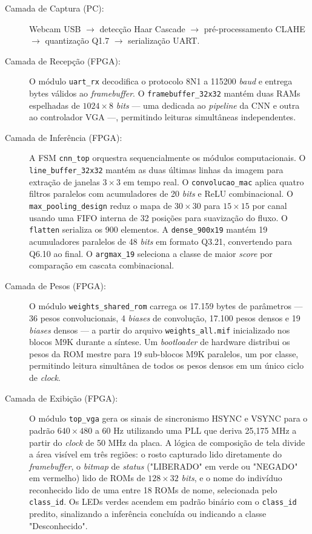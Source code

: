 \begin{description}
    \item[Camada de Captura (PC):] Webcam USB $\rightarrow$ detecção Haar Cascade $\rightarrow$ pré-processamento CLAHE $\rightarrow$ quantização Q1.7 $\rightarrow$ serialização UART.
    \item[Camada de Recepção (FPGA):] O módulo \texttt{uart\_rx} decodifica o protocolo 8N1 a 115200 \textit{baud} e entrega bytes válidos ao \textit{framebuffer}. O \texttt{framebuffer\_32x32} mantém duas RAMs espelhadas de $1024 \times 8$ \textit{bits} — uma dedicada ao \textit{pipeline} da CNN e outra ao controlador VGA —, permitindo leituras simultâneas independentes.
    \item[Camada de Inferência (FPGA):] A FSM \texttt{cnn\_top} orquestra sequencialmente os módulos computacionais. O \texttt{line\_buffer\_32x32} mantém as duas últimas linhas da imagem para extração de janelas $3 \times 3$ em tempo real. O \texttt{convolucao\_mac} aplica quatro filtros paralelos com acumuladores de 20 \textit{bits} e ReLU combinacional. O \texttt{max\_pooling\_design} reduz o mapa de $30 \times 30$ para $15 \times 15$ por canal usando uma FIFO interna de 32 posições para suavização do fluxo. O \texttt{flatten} serializa os 900 elementos. A \texttt{dense\_900x19} mantém 19 acumuladores paralelos de 48 \textit{bits} em formato Q3.21, convertendo para Q6.10 ao final. O \texttt{argmax\_19} seleciona a classe de maior \textit{score} por comparação em cascata combinacional.
    \item[Camada de Pesos (FPGA):] O módulo \texttt{weights\_shared\_rom} carrega os 17.159 bytes de parâmetros — 36 pesos convolucionais, 4 \textit{biases} de convolução, 17.100 pesos densos e 19 \textit{biases} densos — a partir do arquivo \texttt{weights\_all.mif} inicializado nos blocos M9K durante a síntese. Um \textit{bootloader} de hardware distribui os pesos da ROM mestre para 19 sub-blocos M9K paralelos, um por classe, permitindo leitura simultânea de todos os pesos densos em um único ciclo de \textit{clock}.
    \item[Camada de Exibição (FPGA):] O módulo \texttt{top\_vga} gera os sinais de sincronismo HSYNC e VSYNC para o padrão $640 \times 480$ a 60 Hz utilizando uma PLL que deriva 25,175 MHz a partir do \textit{clock} de 50 MHz da placa. A lógica de composição de tela divide a área visível em três regiões: o rosto capturado lido diretamente do \textit{framebuffer}, o \textit{bitmap} de \textit{status} ("LIBERADO" em verde ou "NEGADO" em vermelho) lido de ROMs de $128 \times 32$ \textit{bits}, e o nome do indivíduo reconhecido lido de uma entre 18 ROMs de nome, selecionada pelo \texttt{class\_id}. Os LEDs verdes acendem em padrão binário com o \texttt{class\_id} predito, sinalizando a inferência concluída ou indicando a classe "Desconhecido".
\end{description}

